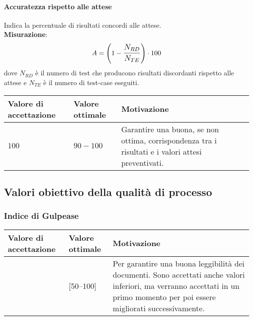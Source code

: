 \paragraph{Accuratezza rispetto alle attese}
Indica la percentuale di risultati concordi alle attese. \\
\textbf{Misurazione}: 
		$$A=\left(1-\mathlarger{\frac{N_{RD}}{N_{TE}}}\right) \cdot 100$$
	dove $N_{RD}$ è il numero di test che producono risultati discordanti rispetto alle attese e $N_{TE}$ è il numero di test-case eseguiti.
	
\begin{center}
	\begin{tabular}{|P{2.5cm}|P{2.5cm}|P{6cm}|}
		\hline
			\textbf{Valore di accettazione}	& \textbf{Valore ottimale} & \textbf{Motivazione} \\
			\hline
			$100$ & $90 - 100$ & Garantire una buona, se non ottima, corrispondenza tra i risultati e i valori attesi preventivati. \\
			\hline
			\end{tabular}
\end{center}	


















\newpage


\subsection{Valori obiettivo della qualità di processo}

\subsubsection{Indice di Gulpease}

\begin{center}

		\begin{tabular}{|P{2.5cm}|P{2.5cm}|P{6cm}|}
		\hline
			\textbf{Valore di accettazione}	& \textbf{Valore ottimale} & \textbf{Motivazione} \\
			\hline
			[40 -- 100] & [50--100] &	Per garantire una buona leggibilità dei documenti. Sono accettati anche valori inferiori, ma verranno accettati in un primo momento per poi essere migliorati successivamente. \\
			\hline
			\end{tabular}
\end{center}

